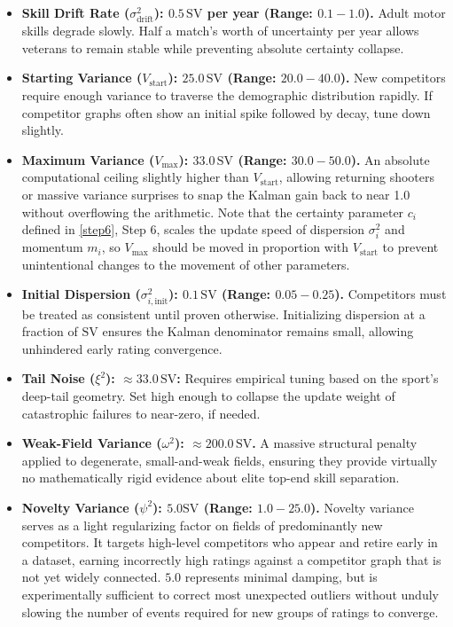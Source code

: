 \documentclass[12pt]{article}
\begin{document}
	\begin{itemize}
		\item \textbf{Skill Drift Rate ($\sigma_{\mathrm{drift}}^2$): $0.5\,\mathrm{SV}$ per year (Range: $0.1 - 1.0$).}
		Adult motor skills degrade slowly. Half a match's worth of uncertainty per year allows veterans to remain stable while preventing absolute certainty collapse.
		\item \textbf{Starting Variance ($V_{\mathrm{start}}$): $25.0\,\mathrm{SV}$ (Range: $20.0 - 40.0$).}
		New competitors require enough variance to traverse the demographic distribution rapidly. If competitor graphs often show an initial spike followed by decay, tune down slightly.
		\item \textbf{Maximum Variance ($V_{\max}$): $33.0\,\mathrm{SV}$ (Range: $30.0 - 50.0$).}
		An absolute computational ceiling slightly higher than $V_{\mathrm{start}}$, allowing returning shooters or massive variance surprises to snap the Kalman gain back to near 1.0 without overflowing the arithmetic. Note that the certainty parameter $c_i$ defined in \ref{step6}, Step 6, scales the update speed of dispersion $\sigma_i^2$ and momentum $m_i$, so $V_{\max}$ should be moved in proportion with $V_\mathrm{start}$ to prevent unintentional changes to the movement of other parameters.
		\item \textbf{Initial Dispersion ($\sigma_{i,\mathrm{init}}^2$): $0.1\,\mathrm{SV}$ (Range: $0.05 - 0.25$).}
		Competitors must be treated as consistent until proven otherwise. Initializing dispersion at a fraction of $\mathrm{SV}$ ensures the Kalman denominator remains small, allowing unhindered early rating convergence.
		\item \textbf{Tail Noise ($\xi^2$): $\approx 33.0\,\mathrm{SV}$:}
		Requires empirical tuning based on the sport's deep-tail geometry. Set high enough to collapse the update weight of catastrophic failures to near-zero, if needed.
		\item \textbf{Weak-Field Variance ($\omega^2$): $\approx 200.0\,\mathrm{SV}$.}
		A massive structural penalty applied to degenerate, small-and-weak fields, ensuring they provide virtually no mathematically rigid evidence about elite top-end skill separation.
		\item \textbf{Novelty Variance ($\psi^2$): $5.0 \mathrm{SV}$ (Range: $1.0 - 25.0$).}
		Novelty variance serves as a light regularizing factor on fields of predominantly new competitors. It targets high-level competitors who appear and retire early in a dataset, earning incorrectly high ratings against a competitor graph that is not yet widely connected. $5.0$ represents minimal damping, but is experimentally sufficient to correct most unexpected outliers without unduly slowing the number of events required for new groups of ratings to converge.

\end{itemize}
\end{document}
